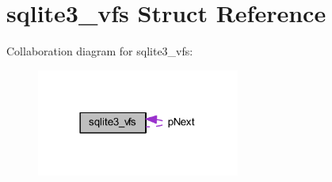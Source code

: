 \hypertarget{structsqlite3__vfs}{\section{sqlite3\-\_\-vfs Struct Reference}
\label{structsqlite3__vfs}
}


Collaboration diagram for sqlite3\-\_\-vfs\-:\nopagebreak
\begin{figure}[H]
\begin{center}
\leavevmode
\includegraphics[width=189pt]{structsqlite3__vfs__coll__graph}
\end{center}
\end{figure}
